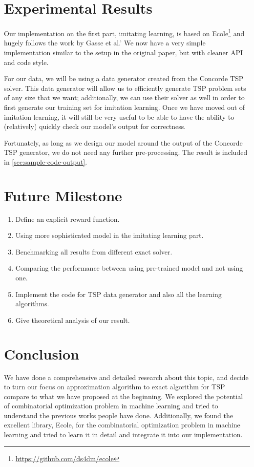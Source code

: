 \documentclass{article}
\begin{document}
\section{Experimental Results}
Our implementation on the first part, imitating learning, is based on Ecole\footnote{\url{https://github.com/ds4dm/ecole}} and hugely follows the
work by Gasse et al.'\cite{GasseCFCL19} We now have a very simple implementation similar to the setup in the original paper, but with cleaner
API and code style.

For our data, we will be using a data generator created from the Concorde TSP solver. This data generator will allow us to efficiently generate TSP problem sets of any size
that we want; additionally, we can use their solver as well in order to first generate our training set for imitation learning. Once we have moved out of imitation learning, it will still be
very useful to be able to have the ability to (relatively) quickly check our model's output for correctness.

Fortunately, as long as we design our model around the output of the Concorde TSP generator, we do not need any further pre-processing. The result is included in
\autoref{sec:sample-code-output}.

\section{Future Milestone}
\begin{enumerate}
	\item Define an explicit reward function.
	\item Using more sophisticated model in the imitating learning part.
	\item Benchmarking all results from different exact solver.
	\item Comparing the performance between using pre-trained model and not using one.
	\item Implement the code for TSP data generator and also all the learning algorithms.
	\item Give theoretical analysis of our result.
\end{enumerate}

\section{Conclusion}
We have done a comprehensive and detailed research about this topic, and decide to turn our focus on approximation algorithm to exact algorithm  for TSP
compare to what we have proposed at the beginning. We explored the potential of combinatorial optimization problem in machine learning and tried to
understand the previous works people have done. Additionally, we found the excellent library, Ecole, for the combinatorial optimization problem
in machine learning and tried to learn it in detail and integrate it into our implementation.
\end{document}
